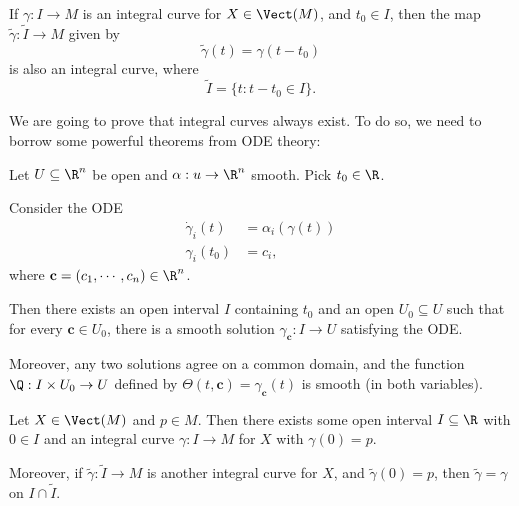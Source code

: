 \documentclass[a4paper]{article}
\begin{document}
\begin{ex}
  If $\gamma: I \to M$ is an integral curve for $X \in \Vect(M)$, and $t_0 \in I$, then the map $\tilde{\gamma}: \tilde{I} \to M$ given by
  \[
    \tilde{\gamma}(t) = \gamma(t - t_0)
  \]
  is also an integral curve, where
  \[
    \tilde{I} = \{t: t - t_0 \in I\}.
  \]
\end{ex}

We are going to prove that integral curves always exist. To do so, we need to borrow some powerful theorems from ODE theory:
\begin{thm}
  Let $U \subseteq \R^n$ be open and $\alpha: u \to \R^n$ smooth. Pick $t_0 \in \R$.

  Consider the ODE
  \begin{align*}
    \dot{\gamma}_i(t) &= \alpha_i(\gamma(t))\\
    \gamma_i(t_0) &= c_i,
  \end{align*}
  where $\mathbf{c} = (c_1, \cdots, c_n) \in \R^n$.

  Then there exists an open interval $I$ containing $t_0$ and an open $U_0 \subseteq U$ such that for every $\mathbf{c} \in U_0$, there is a smooth solution $\gamma_\mathbf{c}:I \to U$ satisfying the ODE.

  Moreover, any two solutions agree on a common domain, and the function $\Q: I \times U_0 \to U$ defined by $\Theta(t, \mathbf{c}) = \gamma_\mathbf{c}(t)$ is smooth (in both variables).
\end{thm}

\begin{thm}
  Let $X \in \Vect(M)$ and $p \in M$. Then there exists some open interval $I \subseteq \R$ with $0 \in I$ and an integral curve $\gamma: I \to M$ for $X$ with $\gamma(0) = p$.

  Moreover, if $\tilde{\gamma}: \tilde{I} \to M$ is another integral curve for $X$, and $\tilde{\gamma}(0) = p$, then $\tilde{\gamma} = \gamma$ on $I \cap \tilde{I}$.
\end{thm}
\end{document}

